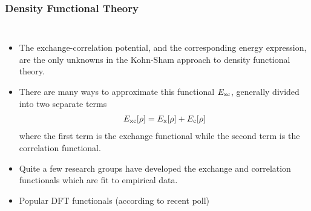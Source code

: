 \documentclass[slidestop,mathserif,compress,xcolor=svgnames]{beamer}
\begin{document}
\begin{frame}
\frametitle{\small Density Functional Theory}
\footnotesize{
\begin{columns}
\column{12cm}
\begin{itemize}
\item The exchange-correlation potential, and the corresponding energy expression, are the only unknowns in the Kohn-Sham approach to density functional theory. 
%
\item There are many ways to approximate this functional $E_{\rm xc}$, generally divided into two separate terms
\begin{align*}
E_{\rm xc}[\rho] = E_{\rm x}[\rho] + E_{\rm c}[\rho]
\end{align*}
where the first term is the exchange functional while the second term is the correlation functional.
\item Quite a few research groups have developed the exchange and correlation functionals which are fit to empirical data.
\item Popular DFT functionals (according to recent poll)
\end{itemize}
\end{columns}
}
\end{frame}
\end{document}

